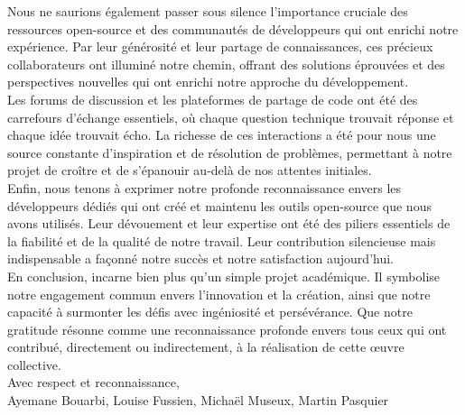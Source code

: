 Nous ne saurions également passer sous silence l'importance cruciale des ressources open-source et des communautés de développeurs qui ont enrichi notre expérience.
Par leur générosité et leur partage de connaissances, ces précieux collaborateurs ont illuminé notre chemin, offrant des solutions éprouvées et des perspectives
nouvelles qui ont enrichi notre approche du développement.
\\

Les forums de discussion et les plateformes de partage de code ont été des carrefours d'échange essentiels, où chaque question technique trouvait réponse et chaque
idée trouvait écho. La richesse de ces interactions a été pour nous une source constante d'inspiration et de résolution de problèmes, permettant à notre projet de
croître et de s'épanouir au-delà de nos attentes initiales.
\\

Enfin, nous tenons à exprimer notre profonde reconnaissance envers les développeurs dédiés qui ont créé et maintenu les outils open-source que nous avons utilisés.
Leur dévouement et leur expertise ont été des piliers essentiels de la fiabilité et de la qualité de notre travail. Leur contribution silencieuse mais indispensable
a façonné notre succès et notre satisfaction aujourd'hui.
\\

En conclusion, \gameName incarne bien plus qu'un simple projet académique. Il symbolise notre engagement commun envers l'innovation et la création, ainsi
que notre capacité à surmonter les défis avec ingéniosité et persévérance. Que notre gratitude résonne comme une reconnaissance profonde envers tous ceux qui ont
contribué, directement ou indirectement, à la réalisation de cette œuvre collective.
\\

Avec respect et reconnaissance,
\\

Ayemane Bouarbi, Louise Fussien, Michaël Museux, Martin Pasquier